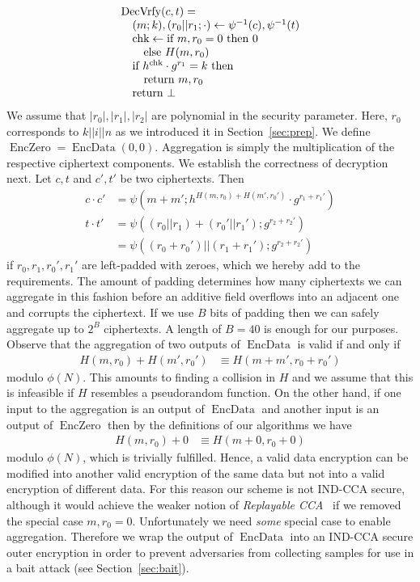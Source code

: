 \documentclass[twocolumn,10pt]{article}
\DeclareMathOperator{\EncData}{EncData}
\DeclareMathOperator{\EncZero}{EncZero}
\DeclareMathOperator{\DecVrfy}{DecVrfy}
\begin{document}
\begin{displaymath}
  \begin{array}[t]{l}
    \DecVrfy(c,t) = \\
    \quad (m; k), (r_0 || r_1; \cdot) \leftarrow \psi^{-1}(c),
    \psi^{-1}(t) \\
    \quad \text{chk} \leftarrow \text{if}~m,r_0=0 ~\text{then}~ 0 \\
    \qquad \text{else}~ H(m, r_0) \\
    \quad \text{if}~ h^{\text{chk}}\cdot g^{r_1} = k ~\text{then} \\
    \qquad \text{return}~m, r_0\\
    \quad \text{return} ~ \bot
  \end{array}
\end{displaymath}
We assume that $|r_0|,|r_1|,|r_2|$ are polynomial in the security parameter.
Here, $r_0$ corresponds to $k||i||n$ as we introduced it in
Section~\ref{sec:prep}.  We define $\EncZero=\EncData(0,0)$.  Aggregation is
simply the multiplication of the respective ciphertext components.  We
establish the correctness of decryption next.  Let $c,t$ and $c',t'$ be two
ciphertexts.  Then
\begin{align*}
  c\cdot c'
  &=
  \psi(m+m';h^{H(m,r_0)+H(m',r_0')}\cdot g^{r_1+r_1'}) \\
  t\cdot t'
  &=
  \psi((r_0 || r_1)+(r_0' || r_1');g^{r_2+r_2'}) \\
  &=
  \psi((r_0+r_0') || (r_1+r_1');g^{r_2+r_2'})
\end{align*}
if $r_0,r_1,r_0',r_1'$ are left-padded with zeroes, which we hereby add to
the requirements.  The amount of padding determines how many ciphertexts we
can aggregate in this fashion before an additive field overflows into an
adjacent one and corrupts the ciphertext.  If we use $B$ bits of padding
then we can safely aggregate up to $2^B$ ciphertexts.  A length of $B=40$ is
enough for our purposes.  Observe that the aggregation of two outputs of
$\EncData$ is valid if and only if
\begin{align}\label{eq:H}
  H(m,r_0)+H(m',r_0') &\equiv H(m+m',r_0+r_0')
\end{align}
modulo $\phi(N)$.  This amounts to finding a collision in $H$ and we assume
that this is infeasible if $H$ resembles a pseudorandom function.  On the
other hand, if one input to the aggregation is an output of $\EncData$ and
another input is an output of $\EncZero$ then by the definitions of our
algorithms we have
\begin{align*}
  H(m,r_0)+0 &\equiv H(m+0,r_0+0)
\end{align*}
modulo $\phi(N)$, which is trivially fulfilled.  Hence, a valid data
encryption can be modified into another valid encryption of the same data
but not into a valid encryption of different data.  For this reason our
scheme is not IND-CCA secure, although it would achieve the weaker notion of
\emph{Replayable CCA}~\cite{CanettiKN2003} if we removed the special case
$m,r_0=0$.  Unfortunately we need \emph{some} special case to enable
aggregation.  Therefore we wrap the output of $\EncData$ into an IND-CCA
secure outer encryption in order to prevent adversaries from collecting
samples for use in a bait attack (see Section~\ref{sec:bait}).
\end{document}
